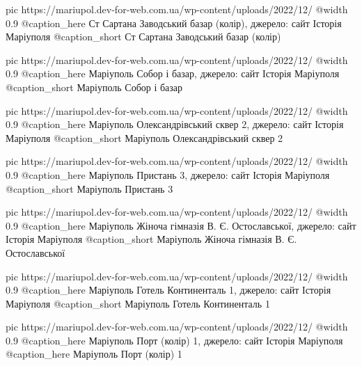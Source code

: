   pic https://mariupol.dev-for-web.com.ua/wp-content/uploads/2022/12/%
  @width 0.9
  @caption_here Ст Сартана Заводський базар (колір), джерело: сайт Історія Маріуполя
  @caption_short Ст Сартана Заводський базар (колір)

  pic https://mariupol.dev-for-web.com.ua/wp-content/uploads/2022/12/%
  @width 0.9
  @caption_here Маріуполь Собор і базар, джерело: сайт Історія Маріуполя
  @caption_short Маріуполь Собор і базар

  pic https://mariupol.dev-for-web.com.ua/wp-content/uploads/2022/12/%
  @width 0.9
  @caption_here Маріуполь Олександрівський сквер 2, джерело: сайт Історія Маріуполя
  @caption_short Маріуполь Олександрівський сквер 2

  pic https://mariupol.dev-for-web.com.ua/wp-content/uploads/2022/12/%
  @width 0.9
  @caption_here Маріуполь Пристань 3, джерело: сайт Історія Маріуполя
  @caption_short Маріуполь Пристань 3

  pic https://mariupol.dev-for-web.com.ua/wp-content/uploads/2022/12/%
  @width 0.9
  @caption_here Маріуполь Жіноча гімназія В. Є. Остославської, джерело: сайт Історія Маріуполя
  @caption_short Маріуполь Жіноча гімназія В. Є. Остославської

  pic https://mariupol.dev-for-web.com.ua/wp-content/uploads/2022/12/%
  @width 0.9
  @caption_here Маріуполь Готель Континенталь 1, джерело: сайт Історія Маріуполя
  @caption_short Маріуполь Готель Континенталь 1

  pic https://mariupol.dev-for-web.com.ua/wp-content/uploads/2022/12/%
  @width 0.9
  @caption_here Маріуполь Порт (колір) 1, джерело: сайт Історія Маріуполя
  @caption_here Маріуполь Порт (колір) 1

